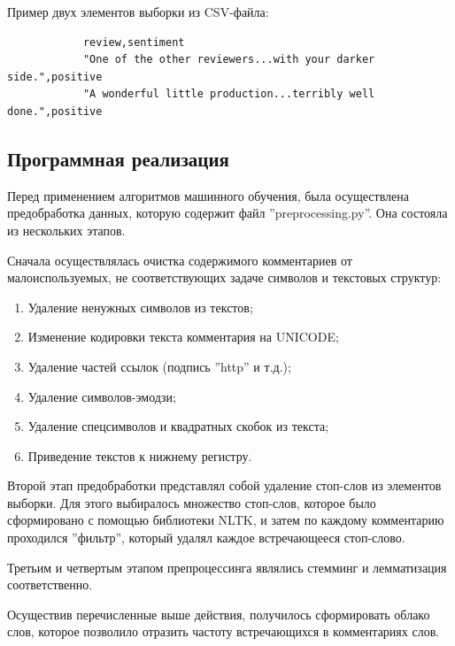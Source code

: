 \documentclass[bachelor, och, coursework]{SCWorks}
\begin{document}
        Пример двух элементов выборки из CSV-файла:
        
        \begin{verbatim}
            review,sentiment
            "One of the other reviewers...with your darker side.",positive
            "A wonderful little production...terribly well done.",positive
        \end{verbatim}

    \subsection{Программная реализация}

        Перед применением алгоритмов машинного обучения, была осуществлена
        предобработка данных, которую содержит файл ''preprocessing.py''. Она
        состояла из нескольких этапов.
        
        Сначала осуществлялась очистка содержимого комментариев от
        малоиспользуемых, не соответствующих задаче символов и текстовых
        структур:

        \begin{enumerate}
            \item Удаление ненужных символов из текстов;
            \item Изменение кодировки текста комментария на UNICODE;
            \item Удаление частей ссылок (подпись ''http'' и т.д.);
            \item Удаление символов-эмодзи;
            \item Удаление спецсимволов и квадратных скобок из текста;
            \item Приведение текстов к нижнему регистру.
        \end{enumerate}

        Второй этап предобработки представлял собой удаление стоп-слов из
        элементов выборки. Для этого выбиралось множество стоп-слов, которое
        было сформировано с помощью библиотеки NLTK, и затем по каждому
        комментарию проходился ''фильтр'', который удалял каждое встречающееся
        стоп-слово.

        Третьим и четвертым этапом препроцессинга являлись стемминг и
        лемматизация соответственно.

        Осуществив перечисленные выше действия, получилось сформировать облако
        слов, которое позволило отразить частоту встречающихся в комментариях
        слов.
\end{document}
